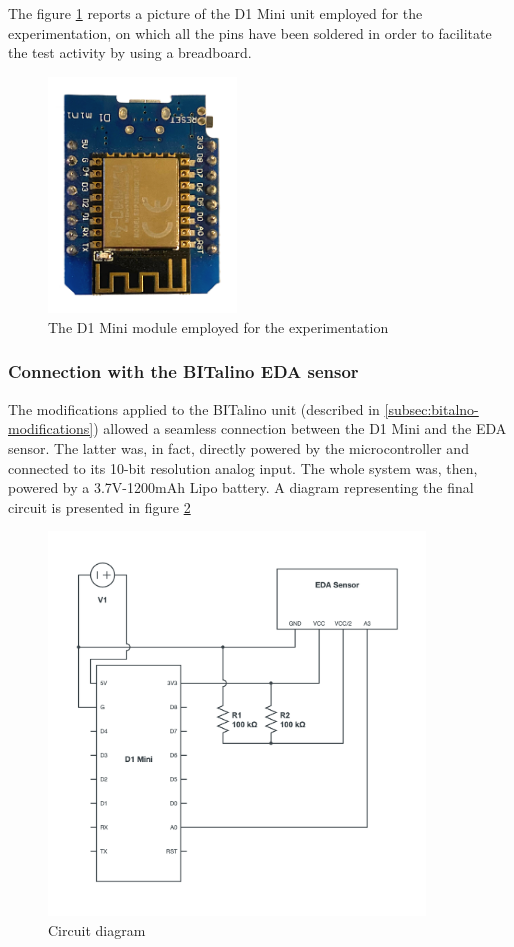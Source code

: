 The figure \ref{fig:d1mini} reports a picture of the D1 Mini unit employed for the experimentation, on which all the pins have been soldered in order to facilitate the test activity by using a breadboard.

\begin{figure}[h]
    \centering
    \includegraphics[width=5cm]{./images/d1mini.png}
    \caption{The D1 Mini module employed for the experimentation}
    \label{fig:d1mini}
\end{figure}

\subsubsection{Connection with the BITalino EDA sensor}\label{subsubsec:d1mini}

The modifications applied to the BITalino unit (described in \ref{subsec:bitalno-modifications}) allowed a seamless connection between the D1 Mini and the EDA sensor. The latter was, in fact, directly powered by the microcontroller and connected to its 10-bit resolution analog input. The whole system was, then, powered by a 3.7V-1200mAh Lipo battery. A diagram representing the final circuit is presented in figure \ref{fig:circuit-diagram}

\begin{figure}[h]
    \centering
    \includegraphics[width=10cm]{./images/circuit-diagram.png}
    \caption{Circuit diagram}
    \label{fig:circuit-diagram}
\end{figure}

